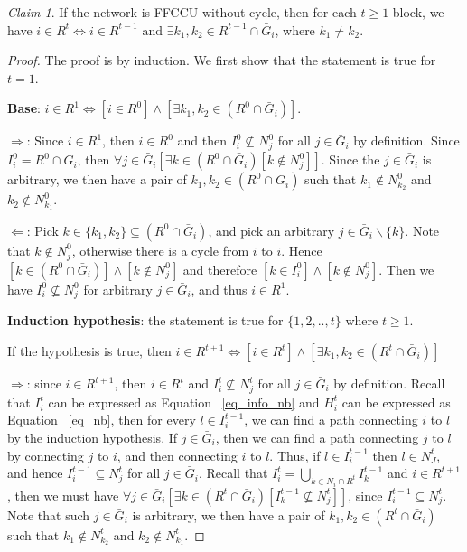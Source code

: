 \documentclass[12pt,letterpaper]{article}
\newtheorem*{main result}{Main Result}
\theoremstyle{definition}
\theoremstyle{remark}
\theoremstyle{claim}
\newtheorem{claim}{Claim}
\begin{document}
\begin{claim}
\label{lemma1}
If the network is FFCCU without cycle, then for each $t\geq 1$ block, we have $i\in R^t\Leftrightarrow i\in R^{t-1} \text{ and } \exists k_1,k_2\in R^{t-1}\cap \bar{G}_i$, where $k_1\neq k_2$.
\end{claim}
\begin{proof}
The proof is by induction. We first show that the statement is true for $t=1$. 

\textbf{Base}: $i\in R^1\Leftrightarrow [i\in R^0] \wedge [\exists k_1,k_2\in (R^0\cap \bar{G}_i)]$. 

$\Rightarrow$: Since $i\in R^1$, then $i\in R^0$ and then $I^0_i\nsubseteq N^0_j$ for all $j\in \bar{G}_i$ by definition. Since $I^0_i=R^0\cap G_i$, then $\forall j\in \bar{G}_i [\exists k\in (R^0\cap \bar{G}_i) [k\notin N^0_j]]$. Since the $j\in \bar{G}_i$ is arbitrary,  we then have a pair of $k_1, k_2 \in (R^0\cap \bar{G}_i)$ such that $k_1\notin N^0_{k_2}$ and $k_2\notin N^0_{k_1}$.

$\Leftarrow$: Pick $k\in \{k_1,k_2\}\subseteq (R^0\cap \bar{G}_i)$, and pick an arbitrary $j\in \bar{G}_i\backslash \{k\}$. Note that $k\notin N^0_j$, otherwise there is a cycle from $i$ to $i$. Hence $[k\in (R^0\cap \bar{G}_i)] \wedge [k\notin N^0_j]$ and therefore $[k\in I^0_i] \wedge [k\notin N^0_j]$. Then we have $I^0_i\nsubseteq N^0_j$ for arbitrary $j\in \bar{G}_i$, and thus $i\in R^1$.

\textbf{Induction hypothesis}: the statement is true for $\{1,2,..,t\}$ where $t\geq 1$. 


If the hypothesis is true, then $i\in R^{t+1}\Leftrightarrow [i\in R^{t}] \wedge [\exists k_1,k_2\in (R^{t}\cap \bar{G}_i)]$


$\Rightarrow$: since $i\in R^{t+1}$, then $i\in R^t$ and $I^t_i\nsubseteq N^t_j$ for all $j\in \bar{G}_i$ by definition. Recall that $I^t_i$ can be expressed as Equation ~\ref{eq_info_nb} and $H^t_i$ can be expressed as Equation ~\ref{eq_nb}, then for every $l\in I^{t-1}_i$, we can find a path connecting $i$ to $l$ by the induction hypothesis. If $j\in \bar{G}_i$, then we can find a path connecting $j$ to $l$ by connecting $j$ to $i$, and then connecting $i$ to $l$. Thus, if $l\in I^{t-1}_i$ then $l\in N^t_J$, and hence $I^{t-1}_i\subseteq N^t_{j}$ for all $j\in \bar{G}_i$. Recall that $I^t_i = \bigcup_{k\in N_i\cap R^t}I^{t-1}_k$ and $i\in R^{t+1}$, then we must have $\forall j\in \bar{G}_i [\exists k\in (R^t\cap \bar{G}_i)[ I^{t-1}_k\nsubseteq N^t_j]]$, since $I^{t-1}_i\subseteq N^t_{j}$. Note that such $j\in \bar{G}_i$ is arbitrary,  we then have a pair of $k_1, k_2 \in (R^{t}\cap \bar{G}_i)$ such that $k_1\notin N^t_{k_2}$ and $k_2\notin N^t_{k_1}$.
\bigskip


\end{proof}
\end{document}
